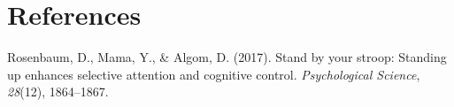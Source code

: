 \documentclass[
  english,
  man]{apa6}
\newlength{\cslhangindent}
\newenvironment{cslreferences}%
  {\setlength{\parindent}{0pt}%
  \everypar{\setlength{\hangindent}{\cslhangindent}}\ignorespaces}%
  {\par}
\begin{document}
\newpage

\hypertarget{references}{%
\section{References}\label{references}}

\begingroup
\setlength{\parindent}{-0.5in}
\setlength{\leftskip}{0.5in}

\hypertarget{refs}{}
\begin{cslreferences}
\leavevmode\hypertarget{ref-rosenbaum2017stand}{}%
Rosenbaum, D., Mama, Y., \& Algom, D. (2017). Stand by your stroop: Standing up enhances selective attention and cognitive control. \emph{Psychological Science}, \emph{28}(12), 1864--1867.
\end{cslreferences}

\endgroup
\end{document}
